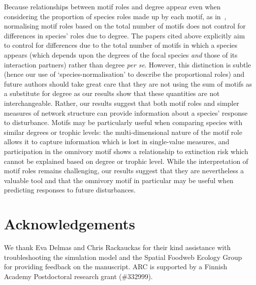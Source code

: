 \documentclass[12pt]{article}
\begin{document}
\begin{spacing}{2.0}
        
	    Because relationships between motif roles and degree appear even when considering the proportion of species roles made up by each motif, as in~\citet{Baker2015,Cirtwill2015,Simmons2019}, normalising motif roles based on the total number of motifs does not control for differences in species' roles due to degree.
	    The papers cited above explicitly aim to control for differences due to the total number of motifs in which a species appears (which depends upon the degrees of the focal species \emph{and} those of its interaction partners) rather than degree \emph{per se}.
	    However, this distinction is subtle (hence our use of `species-normalisation' to describe the proportional roles) and future authors should take great care that they are not using the sum of motifs as a substitute for degree as our results show that these quantities are not interchangeable.
        Rather, our results suggest that both motif roles and simpler measures of network structure can provide information about a species' response to disturbance.
        Motifs may be particularly useful when comparing species with similar degrees or trophic levels: the multi-dimensional nature of the motif role allows it to capture information which is lost in single-value measures, and participation in the omnivory motif shows a relationship to extinction risk which cannot be explained based on degree or trophic level.
        While the interpretation of motif roles remains challenging, our results suggest that they are nevertheless a valuable tool and that the omnivory motif in particular may be useful when predicting responses to future disturbances.
        

\section*{Acknowledgements}

	We thank Eva Delmas and Chris Rackauckas for their kind assistance with troubleshooting the simulation model and the Spatial Foodweb Ecology Group for providing feedback on the manuscript. ARC is supported by a Finnish Academy Postdoctoral research grant (\#332999). 


\clearpage
     

\clearpage
\end{spacing}

\end{document}
